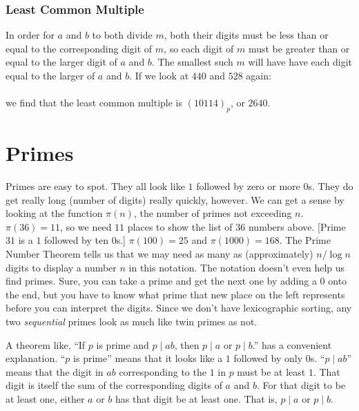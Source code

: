 \documentclass[12pt]{article}
\newcommand{\ppn}[1]{(#1)_p}
\begin{document}
\subsubsection*{Least Common Multiple}
In order for $a$ and $b$ to both divide $m$, both their digits must be less than or equal to the corresponding digit of $m$, so each digit of $m$ must be greater than or equal to the larger digit of $a$ and $b$. The smallest such $m$ will have have each digit equal to the larger of $a$ and $b$. If we look at $440$ and $528$ again:\\
\ttfamily \small
{}
\normalfont \normalsize \\
we find that the least common multiple is $\ppn{10114}$, or $2640$.

\section*{Primes}

Primes are easy to spot. They all look like $1$ followed by zero or more $0$s. They do get really long (number of digits) really quickly, however. We can get a sense by looking at the function $\pi(n)$, the number of primes not exceeding $n$. $\pi(36) = 11$, so we need $11$ places to show the list of $36$ numbers above. [Prime $31$ is a $1$ followed by ten $0$s.] $\pi(100) = 25$ and $\pi(1000) = 168$. The Prime Number Theorem tells us that we may need as many as (approximately) $n / \log n$ digits to display a number $n$ in this notation. The notation doesn't even help us find primes. Sure, you can take a prime and get the next one by adding a $0$ onto the end, but you have to know what prime that new place on the left represents before you can interpret the digits. Since we don't have lexicographic sorting, any two \textit{sequential} primes look as much like twin primes as not.

A theorem like, “If $p$ is prime and $p \mid ab$, then $p \mid a$ or $p \mid b$.” has a convenient explanation. “$p$ is prime” means that it looks like a $1$ followed by only $0$s. “$p \mid ab$” means that the digit in $ab$ corresponding to the $1$ in $p$ must be at least $1$. That digit is itself the sum of the corresponding digits of $a$ and $b$. For that digit to be at least one, either $a$ or $b$ has that digit be at least one. That is, $p \mid a$ or $p \mid b$.
\end{document}
